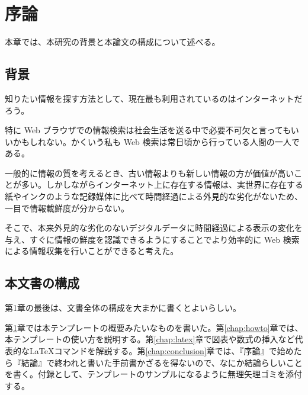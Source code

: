 \chapter{序論}
\label{chap:introduction}

本章では、本研究の背景と本論文の構成について述べる。

\section{背景}

知りたい情報を探す方法として、現在最も利用されているのはインターネットだろう。

特に Web ブラウザでの情報検索は社会生活を送る中で必要不可欠と言ってもいいかもしれない。かくいう私も Web 検索は常日頃から行っている人間の一人である。

一般的に情報の質を考えるとき、古い情報よりも新しい情報の方が価値が高いことが多い。しかしながらインターネット上に存在する情報は、実世界に存在する紙やインクのような記録媒体に比べて時間経過による外見的な劣化がないため、一目で情報載鮮度が分からない。

そこで、本来外見的な劣化のないデジタルデータに時間経過による表示の変化を与え、すぐに情報の鮮度を認識できるようにすることでより効率的に Web 検索による情報収集を行いことができると考えた。

\section{本文書の構成}

第1章の最後は、文書全体の構成を大まかに書くとよいらしい。

第\ref{chap:introduction}章では本テンプレートの概要みたいなものを書いた。第\ref{chap:howto}章では、本テンプレートの使い方を説明する。第\ref{chap:latex}章で図表や数式の挿入など代表的な\LaTeX コマンドを解説する。第\ref{chap:conclusion}章では、『序論』で始めたら『結論』で終われと書いた手前書かざるを得ないので、なにか結論らしいことを書く。付録として、テンプレートのサンプルになるように無理矢理ゴミを添付する。
